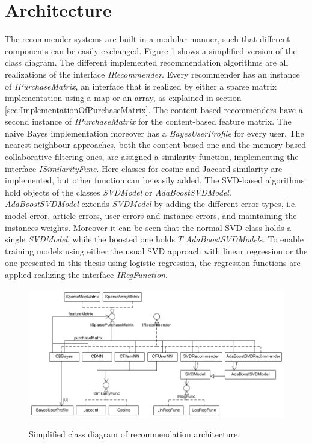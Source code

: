 \documentclass[10pt]{reportMaster}
\begin{document}
\section{Architecture}
\label{sec:Architecture}
The recommender systems are built in a modular manner, such that different components can be easily exchanged.
Figure \ref{fig:classDiagram} shows a simplified version of the class diagram.
The different implemented recommendation algorithms are all realizations of the interface \textit{IRecommender}.
Every recommender has an instance of \textit{IPurchaseMatrix}, an interface that is realized by either a sparse matrix implementation using a map or an array, as explained in section \ref{sec:ImplementationOfPurchaseMatrix}.
The content-based recommenders have a second instance of \textit{IPurchaseMatrix} for the content-based feature matrix.
The naive Bayes implementation moreover has a \textit{BayesUserProfile} for every user.
The nearest-neighbour approaches, both the content-based one and the memory-based collaborative filtering ones, are assigned a similarity function, implementing the interface \textit{ISimilarityFunc}.
Here classes for cosine and Jaccard similarity are implemented, but other function can be easily added.
The SVD-based algorithms hold objects of the classes \textit{SVDModel} or \textit{AdaBoostSVDModel}.
\textit{AdaBoostSVDModel} extends \textit{SVDModel} by adding the different error types, i.e. model error, article errors, user errors and instance errors, and maintaining the instances weights.
Moreover it can be seen that the normal SVD class holds a single \textit{SVDModel}, while the boosted one holds $T$ \textit{AdaBoostSVDModel}s.
To enable training models using either the usual SVD approach with linear regression or the one presented in this thesis using logistic regression, the regression functions are applied realizing the interface \textit{IRegFunction}.

\begin{figure}
	\centering
	\includegraphics[width=1\textwidth]{figures/implementation/classDiagram}
	\label{fig:classDiagram}
	\caption{Simplified class diagram of recommendation architecture.}
\end{figure}
\end{document}
